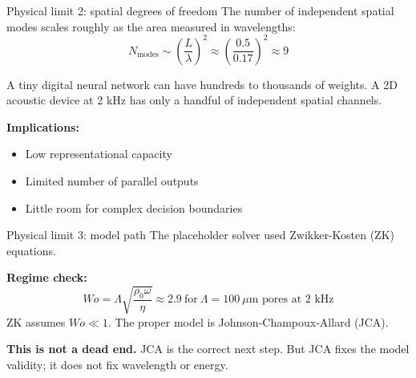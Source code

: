 \documentclass[aspectratio=169,11pt]{beamer}
\begin{document}
\begin{frame}{Physical limit 2: spatial degrees of freedom}
  \small
  The number of independent spatial modes scales roughly as the area measured in wavelengths:
  \[
    N_{\text{modes}} \sim \left( \frac{L}{\lambda} \right)^2 \approx \left( \frac{0.5}{0.17} \right)^2 \approx 9
  \]

  A tiny digital neural network can have hundreds to thousands of weights. A 2D acoustic device at 2 kHz has only a handful of independent spatial channels.

  \vspace{0.3cm}
  \textbf{Implications:}
  \begin{itemize}
    \item Low representational capacity
    \item Limited number of parallel outputs
    \item Little room for complex decision boundaries
  \end{itemize}
\end{frame}

\begin{frame}{Physical limit 3: model path}
  \small
  The placeholder solver used Zwikker-Kosten (ZK) equations.

  \vspace{0.2cm}
  \textbf{Regime check:}
  \[
    Wo = \Lambda \sqrt{\frac{\rho_0 \omega}{\eta}} \approx 2.9\ \text{for}\ \Lambda = 100\ \mu\text{m pores at 2 kHz}
  \]
  ZK assumes $Wo \ll 1$. The proper model is Johnson-Champoux-Allard (JCA).

  \vspace{0.3cm}
  \textbf{This is not a dead end.} JCA is the correct next step. But JCA fixes the model validity; it does not fix wavelength or energy.
\end{frame}
\end{document}
